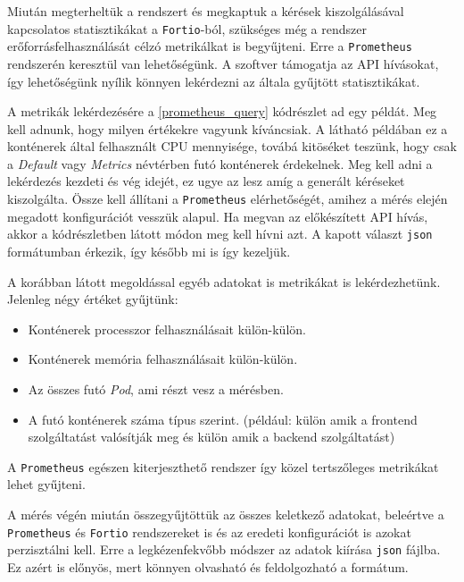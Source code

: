 

Miután megterheltük a rendszert és megkaptuk a kérések kiszolgálásával kapcsolatos statisztikákat a \verb+Fortio+-ból, szükséges még a rendszer erőforrásfelhasználását célzó metrikálkat is begyűjteni. 
Erre a \verb+Prometheus+ rendszerén keresztül van lehetőségünk.
A szoftver támogatja az API hívásokat, így lehetőségünk nyílik könnyen lekérdezni az általa gyűjtött statisztikákat. 

A metrikák lekérdezésére a \ref{prometheus_query} kódrészlet ad egy példát. Meg kell adnunk, hogy milyen értékekre vagyunk kíváncsiak. A látható példában ez a konténerek által felhasznált CPU mennyisége, továbá kitöséket teszünk, hogy csak a \textit{Default} vagy \textit{Metrics} névtérben futó konténerek érdekelnek.
Meg kell adni a lekérdezés kezdeti és vég idejét, ez ugye az lesz amíg a generált kéréseket kiszolgálta.
Össze kell állítani a \verb+Prometheus+ elérhetőségét, amihez a mérés elején megadott konfigurációt vesszük alapul. Ha megvan az előkészített API hívás, akkor a kódrészletben látott módon meg kell hívni azt. A kapott választ \verb+json+ formátumban érkezik, így később mi is így kezeljük. \\




A korábban látott megoldással egyéb adatokat is metrikákat is lekérdezhetünk. Jelenleg négy értéket gyűjtünk:
\begin{itemize}
  \item Konténerek processzor felhasználásait külön-külön.
  \item Konténerek memória felhasználásait külön-külön.
  \item Az összes futó \textit{Pod}, ami részt vesz a mérésben.
  \item A futó konténerek száma típus szerint. (például: külön amik a frontend szolgáltatást valósítják meg és külön amik a backend szolgáltatást)
\end{itemize}

A \verb+Prometheus+ egészen kiterjeszthető rendszer így közel tertszőleges metrikákat lehet gyűjteni. 


A mérés végén miután összegyűjtöttük az összes keletkező adatokat, beleértve a \verb+Prometheus+ és \verb+Fortio+ rendszereket is és az eredeti konfigurációt is azokat perzisztálni kell. Erre a legkézenfekvőbb módszer az adatok kiírása \verb+json+ fájlba. Ez azért is előnyös, mert könnyen olvasható és feldolgozható a formátum. 
